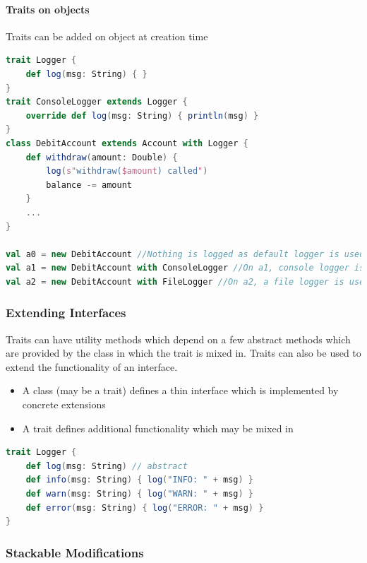 \hypertarget{traits-on-objects}{%
\paragraph{Traits on objects}\label{traits-on-objects}}

Traits can be added on object at creation time

\begin{lstlisting}[language=scala,mathescape=false]
trait Logger {
    def log(msg: String) { }
}
trait ConsoleLogger extends Logger {
    override def log(msg: String) { println(msg) }
}
class DebitAccount extends Account with Logger {
    def withdraw(amount: Double) {
        log(s"withdraw($amount) called")
        balance -= amount
    }
    ...
}

val a0 = new DebitAccount //Nothing is logged as default logger is used
val a1 = new DebitAccount with ConsoleLogger //On a1, console logger is used for logging
val a2 = new DebitAccount with FileLogger //On a2, a file logger is used
\end{lstlisting}

\hypertarget{extending-interfaces}{%
\subsubsection{Extending Interfaces}\label{extending-interfaces}}

Traits can have utility methods which depend on a few abstract methods
which are provided by the class in which the trait is mixed in. Traits
can also be used to extend the functionality of an interface.

\begin{itemize}
\tightlist
\item
  A class (may be a trait) defines a thin interface which is implemented
  by concrete extensions
\item
  A trait defines additional functionality which may be mixed in
\end{itemize}

\begin{lstlisting}[language=scala,mathescape=false]
trait Logger {
    def log(msg: String) // abstract
    def info(msg: String) { log("INFO: " + msg) }
    def warn(msg: String) { log("WARN: " + msg) }
    def error(msg: String) { log("ERROR: " + msg) }
}
\end{lstlisting}

\clearpage
\hypertarget{stackable-modifications}{%
\subsubsection{Stackable Modifications}\label{stackable-modifications}}

